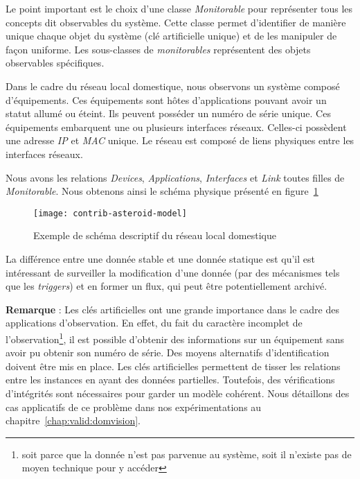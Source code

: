 Le point important est le choix d'une classe \textit{Monitorable} pour représenter tous les concepts dit observables du système. Cette classe permet d'identifier de manière unique chaque objet du système (clé artificielle unique) et de les manipuler de façon uniforme. Les sous-classes de \textit{monitorables} représentent des objets observables spécifiques.

\begin{example}
	Dans le cadre du réseau local domestique, nous observons un système composé d'équipements. Ces équipements sont hôtes d'applications pouvant avoir un statut allumé ou éteint. Ils peuvent posséder un numéro de série unique. Ces équipements embarquent une ou plusieurs interfaces réseaux. Celles-ci possèdent une adresse \textit{IP} et \textit{MAC} unique. Le réseau est composé de liens physiques entre les interfaces réseaux.
	
	Nous avons les relations \textit{Devices}, \textit{Applications}, \textit{Interfaces} et \textit{Link} toutes filles de \textit{Monitorable}. Nous obtenons ainsi le schéma physique présenté en figure~\ref{fig:contrib:asteroid:theorie:model}
	\begin{figure}[ht]
                \centering
		\texttt{[image: contrib-asteroid-model]}
		\caption{Exemple de schéma descriptif du réseau local domestique}\label{fig:contrib:asteroid:theorie:model}
	\end{figure}
\end{example}

La différence entre une donnée stable et une donnée statique est qu'il est intéressant de surveiller la modification d'une donnée (par des mécanismes tels que les \textit{triggers}) et en former un flux, qui peut être potentiellement archivé.

\textbf{Remarque} : Les clés artificielles ont une grande importance dans le cadre des applications d'observation. En effet, du fait du caractère incomplet de l'observation\footnote{soit parce que la donnée n'est pas parvenue au système, soit il n'existe pas de moyen technique pour y accéder}, il est possible d'obtenir des informations sur un équipement sans avoir pu obtenir son numéro de série. Des moyens alternatifs d'identification doivent être mis en place. Les clés artificielles permettent de tisser les relations entre les instances en ayant des données partielles. Toutefois, des vérifications d'intégrités sont nécessaires pour garder un modèle cohérent. Nous détaillons des cas applicatifs de ce problème dans nos expérimentations au chapitre~\ref{chap:valid:domvision}.

